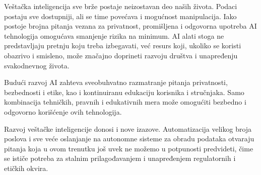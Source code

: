 \documentclass[a4paper,12pt]{article}
\begin{document}
Veštačka inteligencija sve brže postaje neizostavan deo naših života. Podaci postaju sve dostupniji, ali se time povećava i mogućnost manipulacija. Iako postoje brojna pitanja vezana za privatnost, promišljena i odgovorna upotreba AI tehnologija omogućava smanjenje rizika na minimum. AI alati stoga ne predstavljaju pretnju koju treba izbegavati, već resurs koji, ukoliko se koristi obazrivo i smisleno, može značajno doprineti razvoju društva i unapređenju svakodnevnog života.

Budući razvoj AI zahteva sveobuhvatno razmatranje pitanja privatnosti, bezbednosti i etike, kao i kontinuiranu edukaciju korisnika i stručnjaka. Samo kombinacija tehničkih, pravnih i edukativnih mera može omogućiti bezbedno i odgovorno korišćenje ovih tehnologija.

Razvoj veštačke inteligencije donosi i nove izazove. Automatizacija velikog broja poslova i sve veće oslanjanje na autonomne sisteme za obradu podataka otvaraju pitanja koja u ovom trenutku još uvek ne možemo u potpunosti predvideti, čime se ističe potreba za stalnim prilagođavanjem i unapređenjem regulatornih i etičkih okvira.

\AtNextBibliography{\small}
\printbibliography
\end{document}
